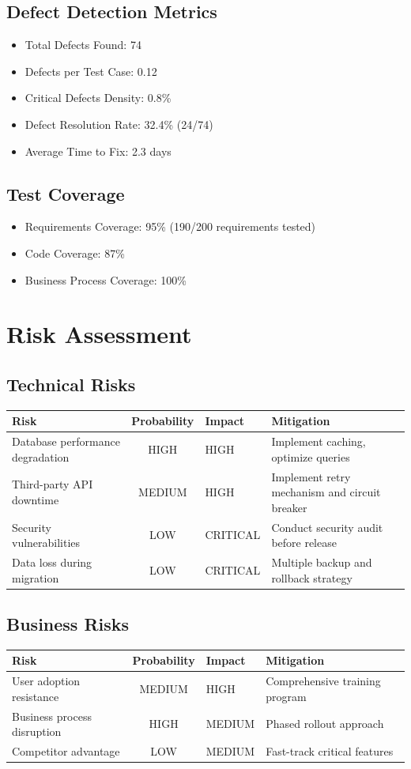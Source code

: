 \documentclass[12pt,a4paper]{article}
\begin{document}
\subsection{Defect Detection Metrics}
\begin{itemize}
  \item Total Defects Found: 74
  \item Defects per Test Case: 0.12
  \item Critical Defects Density: 0.8\%
  \item Defect Resolution Rate: 32.4\% (24/74)
  \item Average Time to Fix: 2.3 days
\end{itemize}

\subsection{Test Coverage}
\begin{itemize}
  \item Requirements Coverage: 95\% (190/200 requirements tested)
  \item Code Coverage: 87\%
  \item Business Process Coverage: 100\%
\end{itemize}

\section{Risk Assessment}
\subsection{Technical Risks}
\begin{tabularx}{\textwidth}{@{}lclX@{}}
\toprule
Risk & Probability & Impact & Mitigation \\
\midrule
Database performance degradation & HIGH & HIGH & Implement caching, optimize queries \\
Third-party API downtime & MEDIUM & HIGH & Implement retry mechanism and circuit breaker \\
Security vulnerabilities & LOW & CRITICAL & Conduct security audit before release \\
Data loss during migration & LOW & CRITICAL & Multiple backup and rollback strategy \\
\bottomrule
\end{tabularx}

\subsection{Business Risks}
\begin{tabularx}{\textwidth}{@{}lclX@{}}
\toprule
Risk & Probability & Impact & Mitigation \\
\midrule
User adoption resistance & MEDIUM & HIGH & Comprehensive training program \\
Business process disruption & HIGH & MEDIUM & Phased rollout approach \\
Competitor advantage & LOW & MEDIUM & Fast-track critical features \\
\bottomrule
\end{tabularx}
\end{document}
